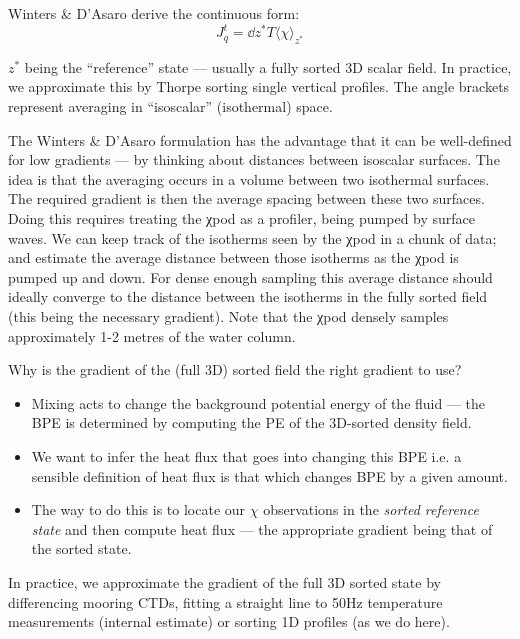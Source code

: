 Winters \& D'Asaro derive the continuous form:
\begin{equation}
  J_q^t =  \dd{z^*}{T} \langle χ \rangle_{z^*}
\end{equation}

$z^*$ being the ``reference'' state — usually a fully sorted 3D scalar field.
In practice, we approximate this by Thorpe sorting single vertical profiles.
The angle brackets represent averaging in ``isoscalar'' (isothermal) space.

The Winters \& D'Asaro formulation has the advantage that it can be well-defined for low gradients — by thinking about distances between isoscalar surfaces.
The idea is that the averaging occurs in a volume between two isothermal surfaces.
The required gradient is then the average spacing between these two surfaces.
Doing this requires treating the χpod as a profiler, being pumped by surface waves.
We can keep track of the isotherms seen by the χpod in a chunk of data; and estimate the average distance between those isotherms as the χpod is pumped up and down.
For dense enough sampling this average distance should ideally converge to the distance between the isotherms in the fully sorted field (this being the necessary gradient).
Note that the χpod densely samples approximately 1-2 metres of the water column.

Why is the gradient of the (full 3D) sorted field the right gradient to use?
\begin{itemize}
  \item Mixing acts to change the background potential energy of the fluid --- the BPE is determined by computing the PE of the 3D-sorted density field.
  \item We want to infer the heat flux that goes into changing this BPE i.e. a sensible definition of heat flux is that which changes BPE by a given amount.
  \item The way to do this is to locate our $χ$ observations in the \emph{sorted reference state} and then compute heat flux --- the appropriate gradient being that of the sorted state.
  \end{itemize}
In practice, we approximate the gradient of the full 3D sorted state by differencing mooring CTDs, fitting a straight line to 50Hz temperature measurements (internal estimate) or sorting 1D profiles (as we do here).

